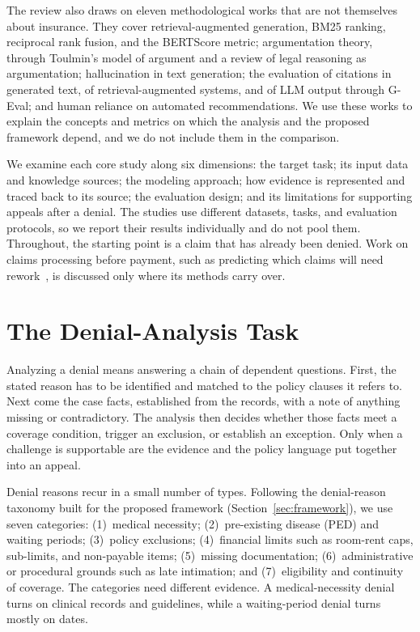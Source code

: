 \documentclass[conference]{IEEEtran}
\begin{document}
The review also draws on eleven methodological works that are not themselves about insurance. They cover retrieval-augmented generation, BM25 ranking, reciprocal rank fusion, and the BERTScore metric; argumentation theory, through Toulmin's model of argument and a review of legal reasoning as argumentation; hallucination in text generation; the evaluation of citations in generated text, of retrieval-augmented systems, and of LLM output through G-Eval; and human reliance on automated recommendations. We use these works to explain the concepts and metrics on which the analysis and the proposed framework depend, and we do not include them in the comparison.

We examine each core study along six dimensions: the target task; its input data and knowledge sources; the modeling approach; how evidence is represented and traced back to its source; the evaluation design; and its limitations for supporting appeals after a denial. The studies use different datasets, tasks, and evaluation protocols, so we report their results individually and do not pool them. Throughout, the starting point is a claim that has already been denied. Work on claims processing before payment, such as predicting which claims will need rework~\cite{kumar2010}, is discussed only where its methods carry over.

\section{The Denial-Analysis Task}
\label{sec:context}
Analyzing a denial means answering a chain of dependent questions. First, the stated reason has to be identified and matched to the policy clauses it refers to. Next come the case facts, established from the records, with a note of anything missing or contradictory. The analysis then decides whether those facts meet a coverage condition, trigger an exclusion, or establish an exception. Only when a challenge is supportable are the evidence and the policy language put together into an appeal.

Denial reasons recur in a small number of types. Following the denial-reason taxonomy built for the proposed framework (Section~\ref{sec:framework}), we use seven categories: (1)~medical necessity; (2)~pre-existing disease (PED) and waiting periods; (3)~policy exclusions; (4)~financial limits such as room-rent caps, sub-limits, and non-payable items; (5)~missing documentation; (6)~administrative or procedural grounds such as late intimation; and (7)~eligibility and continuity of coverage. The categories need different evidence. A medical-necessity denial turns on clinical records and guidelines, while a waiting-period denial turns mostly on dates.
\end{document}
